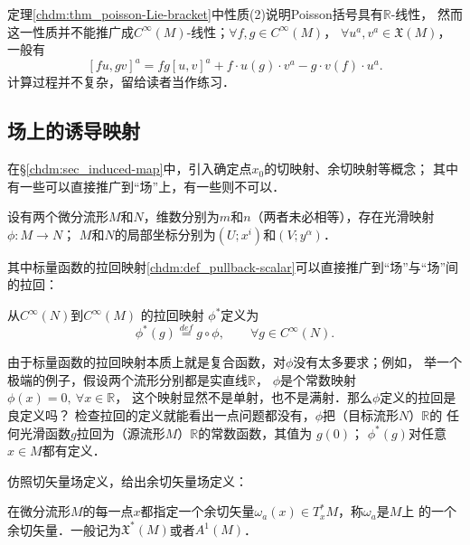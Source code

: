 定理\ref{chdm:thm_poisson-Lie-bracket}中性质(2)说明Poisson括号具有$\mathbb{R}$-线性，
然而这一性质并不能推广成$C^\infty(M)$-线性；$\forall f,g\in C^\infty (M)$，
$\forall u^a,v^a \in \mathfrak{X}(M)$，一般有
\begin{equation}\label{chdm:eqn_fg-PoissonBracket}
    [f u, g v]^a = fg[u,v]^a+f\cdot u(g)\cdot v^a -g\cdot v(f)\cdot u^a .
\end{equation}
计算过程并不复杂，留给读者当作练习．



\subsection{场上的诱导映射}\label{chdm:sec_induced-map-on-fields}
在\S\ref{chdm:sec_induced-map}中，引入确定点$x_0$的切映射、余切映射等概念；
其中有一些可以直接推广到“场”上，有一些则不可以．

设有两个微分流形$M$和$N$，维数分别为$m$和$n$（两者未必相等），存在光滑映射$\phi:M\to N$；
$M$和$N$的局部坐标分别为$(U;x^i)$和$(V;y^\alpha)$．

其中标量函数的拉回映射\ref{chdm:def_pullback-scalar}可以直接推广到“场”与“场”间的拉回：
\begin{definition}\label{chdm:def_pullback-scalar-onfield}
    从$C^\infty(N)$到$C^\infty(M)$
    的{\heiti 拉回映射} $\phi^{*}$定义为
    \begin{equation}
        \phi^{*}(g) \overset{def}{=} g \circ \phi, 
        \qquad \forall g\in C^\infty(N) .
    \end{equation}
\end{definition}
由于标量函数的拉回映射本质上就是复合函数，对$\phi$没有太多要求；例如，
举一个极端的例子，假设两个流形分别都是实直线$\mathbb{R}$，
$\phi$是个常数映射 $\phi(x)=0,\ \forall x \in \mathbb{R}$，
这个映射显然不是单射，也不是满射．那么$\phi$定义的拉回是良定义吗？
检查拉回的定义就能看出一点问题都没有，$\phi$把（目标流形$N$）$\mathbb{R}$的
任何光滑函数$g$拉回为（源流形$M$）$\mathbb{R}$的常数函数，其值为 $g(0)$；
$\phi^*(g)$对任意$x\in M$都有定义．

仿照切矢量场定义，给出余切矢量场定义：
\begin{definition}\label{chdm:def_cotangent-vector-field}
    在微分流形$M$的每一点$x$都指定一个余切矢量$\omega_a(x)\in T^{*}_xM$，称$\omega_a$是$M$上
    的一个{\heiti 余切矢量}．一般记为$\mathfrak{X}^{*}(M)$或者$A^1(M)$．
\end{definition}

